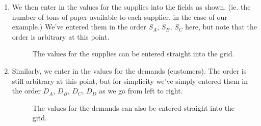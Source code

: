 \documentclass[a4paper,12pt]{article}
\begin{document}
\begin{enumerate}
\item
We then enter in the values for the supplies into the fields as shown. (ie. the number of tons of paper available to each supplier, in the case of our example.) We've entered them in the order $S_A$, $S_B$, $S_C$ here, but note that the order is arbitrary at this point.

\begin{figure}[h!]
\centering
{}
\caption{The values for the supplies can be entered straight into the grid.}
\end{figure}

\newpage

\item
Similarly, we enter in the values for the demands (customers). The order is still arbitrary at this point, but for simplicity we've simply entered them in the order $D_A$, $D_B$, $D_C$, $D_D$ as we go from left to right.

\begin{figure}[h!]
\centering
{}
\caption{The values for the demands can also be entered straight into the grid.}
\end{figure}


\end{enumerate}
\end{document}
